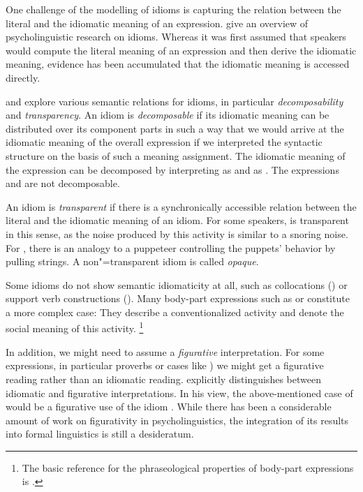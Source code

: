 \documentclass[output=paper
	        ,collection
	        ,collectionchapter
 	        ,biblatex
                ,babelshorthands
                ,newtxmath
                ,draftmode
                ,colorlinks, citecolor=brown
]{langscibook}
\begin{document}
One challenge of the modelling of idioms is capturing the relation between the literal and the idiomatic meaning of an expression.
\citet{Gibbs:Colston:07} give an overview of 
psycholinguistic research on idioms. Whereas it was first assumed that speakers would compute the literal meaning of an expression and then derive the idiomatic meaning, evidence has been accumulated that the idiomatic meaning is accessed directly.

\citet{WSN84a-u} and \citet{NSW94a} explore various semantic relations for idioms, in particular \emph{decomposability}  and \emph{transparency}.
An idiom is \emph{decomposable} if its idiomatic meaning can be distributed over its component parts in such a way that we would arrive at the idiomatic meaning of the overall expression if we interpreted the syntactic structure on the basis of such a meaning assignment. 
The idiomatic meaning of the expression  can be decomposed by interpreting  as  and  as . 
The expressions  and  are not decomposable.

An idiom is \emph{transparent} if there is a synchronically accessible relation between the literal and the idiomatic meaning of an idiom. 
For some speakers,  is transparent in this sense, as the noise produced by this activity is similar to a snoring noise. 
For , there is an analogy to a puppeteer controlling the puppets' behavior by pulling strings. A non"=transparent idiom is called \emph{opaque}. 

Some idioms do not show semantic idiomaticity at all, such as collocations () or support verb constructions (). 
Many body-part expressions such as  or  constitute a more complex case: They describe a conventionalized activity and denote the social meaning of this activity.%
\footnote{The basic reference for the phraseological properties of body-part expressions is \cite{Burger:76}.}

In addition, we might need to assume a \emph{figurative} interpretation. For some expressions, in particular proverbs or cases like 
) we might get a figurative reading rather than an idiomatic reading. 
%
\citet{Glucksberg:01} explicitly distinguishes between idiomatic and figurative interpretations. In his view, the above-mentioned case of  would be a figurative use of the idiom . 
While there has been a considerable amount of work on figurativity in psycholinguistics, the integration of its results into formal linguistics is still a desideratum.%
\end{document}
